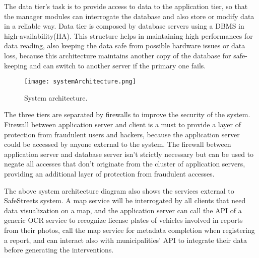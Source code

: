 The data tier's task is to provide access to data to the application tier, so that the manager modules can interrogate the database and also store or modify data in a reliable way. Data tier is composed by database servers using a DBMS in high-availability(HA). This structure helps in maintaining high performances for data reading, also keeping the data safe from possible hardware issues or data loss, because this architecture maintains another copy of the database for safe-keeping and can switch to another server if the primary one fails.

\begin{figure}[H]
	\centering
	\texttt{[image: systemArchitecture.png]}
	\caption{System architecture.}
\end{figure}

The three tiers are separated by firewalls to improve the security of the system. Firewall between application server and client is a must to provide a layer of protection from fraudulent users and hackers, because the application server could be accessed by anyone external to the system. The firewall between application server and database server isn't strictly necessary but can be used to negate all accesses that don't originate from the cluster of application servers, providing an additional layer of protection from fraudulent accesses.

The above system architecture diagram also shows the services external to SafeStreets system. A map service will be interrogated by all clients that need data visualization on a map, and the application server can call the API of a generic OCR service to recognize license plates of vehicles involved in reports from their photos, call the map service for metadata completion when registering a report, and can interact also with municipalities' API to integrate their data before generating the interventions.
